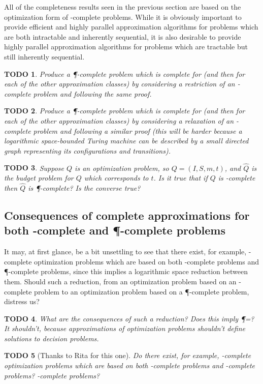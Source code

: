 \documentclass[]{article}
\theoremstyle{plain}
\newtheorem{todo}{TODO}
\theoremstyle{definition}
\begin{document}
All of the completeness results seen in the previous section are based on the optimization form of \NP-complete problems.
While it is obviously important to provide efficient and highly parallel approximation algorithms for problems which are both intractable and inherently sequential, it is also desirable to provide highly parallel approximation algorithms for problems which are tractable but still inherently sequential.

\begin{todo}
  Produce a \P-complete problem which is complete for \ApxNCO{} (and then for each of the other approximation classes) by considering a restriction of an \NP-complete problem and following the same proof.
\end{todo}

\begin{todo}
  Produce a \P-complete problem which is complete for \ApxNCO{} (and then for each of the other approximation classes) by considering a relaxation of an \NL-complete problem and following a similar proof (this will be harder because a logarithmic space-bounded Turing machine can be described by a small directed graph representing its configurations and transitions).
\end{todo}

\begin{todo}
  Suppose $Q$ is an optimization problem, so $Q=(I, S, m, t)$, and $\hat{Q}$ is the budget problem for $Q$ which corresponds to $t$.
  Is it true that if $Q$ is \PO-complete then $\hat{Q}$ is \P-complete?
  Is the converse true?
\end{todo}

\subsection{Consequences of complete approximations for both \texorpdfstring{\NP}{NP}-complete and \texorpdfstring{\P}{P}-complete problems}

It may, at first glance, be a bit unsettling to see that there exist, for example, \ApxNCO-complete optimization problems which are based on both \NP-complete problems and \P-complete problems, since this implies a logarithmic space reduction between them.
Should such a reduction, from an optimization problem based on an \NP-complete problem to an optimization problem based on a \P-complete problem, distress us?

\begin{todo}
  What are the consequences of such a reduction?
  Does this imply \P=\NP?
  It shouldn't, because approximations of optimization problems shouldn't define solutions to decision problems.
\end{todo}
\begin{todo}[Thanks to Rita for this one]
  Do there exist, for example, \ApxPO-complete optimization problems which are based on both \NP-complete problems and \PSPACE-complete problems?
  \STP-complete problems?
\end{todo}
\end{document}

